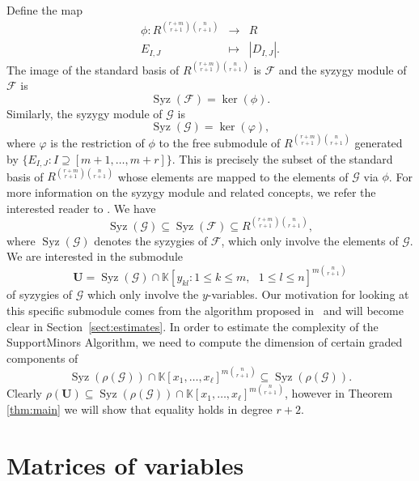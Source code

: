 \documentclass[utf8,latin1]{article}
\DeclareMathOperator{\Syz}{Syz}
\newcommand{\KK}{\mathbb{K}}
\begin{document}
Define the map
$$\begin{array}{rcl}
\phi:R^{\binom{r+m}{r+1} \binom{n}{r+1}} & \rightarrow & R \\
E_{I,J} & \mapsto & |D_{I,J}|.
\end{array}$$
The image of the standard basis of $R^{\binom{r+m}{r+1} \binom{n}{r+1}}$ is $\mathcal{F}$ and the syzygy module of $\mathcal{F}$ is $$\Syz(\mathcal{F})=\ker(\phi).$$
Similarly, the syzygy module of $\mathcal{G}$ is $$\Syz(\mathcal{G})=\ker(\varphi),$$ where $\varphi$ is the restriction of $\phi$ to the free submodule of $R^{\binom{r+m}{r+1} \binom{n}{r+1}}$ generated by $\{E_{I,J}: I\supseteq[m+1,\ldots,m+r]\}.$
This is precisely the subset of the standard basis of $R^{\binom{r+m}{r+1} \binom{n}{r+1}}$ whose elements are mapped to the elements of $\mathcal{G}$ via $\phi$. 
For more information on the syzygy module and related concepts, we refer the interested reader to \cite[Chapter 2.3]{KR00}. We have $$\Syz(\mathcal{G})\subseteq\Syz(\mathcal{F})\subseteq R^{\binom{r+m}{r+1} \binom{n}{r+1}},$$ where $\Syz(\mathcal{G})$ denotes the syzygies of $\mathcal{F}$, which only involve the elements of $\mathcal{G}$. 
We are interested in the submodule
$$\mathbf{U}=\Syz(\mathcal{G}) \cap \KK[y_{kl}: 1 \leq k \leq m, \mbox{ } 1 \leq l \leq n]^{m \binom{n}{r+1}}$$
of syzygies of $\mathcal{G}$ which only involve the $y$-variables.
Our motivation for looking at this specific submodule comes from the algorithm proposed in~\cite{BBCGPSTV20} and will become clear in Section~\ref{sect:estimates}. 
In order to estimate the complexity of the SupportMinors Algorithm, we need to compute the dimension of certain graded components of $$\Syz(\rho(\mathcal{G}))\cap \KK[x_1,\ldots,x_{\ell}]^{m \binom{n}{r+1}}\subseteq \Syz(\rho(\mathcal{G})).$$
Clearly $\rho(\mathbf{U})\subseteq \Syz(\rho(\mathcal{G}))\cap \KK[x_1,\ldots,x_{\ell}]^{m \binom{n}{r+1}}$, however in Theorem \ref{thm:main} we will show that equality holds in degree $r+2$. 



\section{Matrices of variables}\label{sect:generic}
\end{document}
